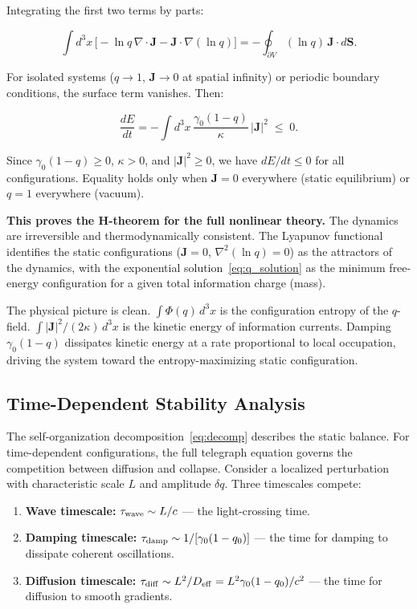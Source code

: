 \documentclass[aps,prd,twocolumn,showpacs,superscriptaddress,preprintnumbers]{revtex4-2}
\begin{document}
Integrating the first two terms by parts:

\begin{equation}
\int d^3x\,\bigl[-\ln q\,\nabla\cdot\mathbf{J} - \mathbf{J}\cdot\nabla(\ln q)\bigr] = -\oint_{\partial V} (\ln q)\,\mathbf{J}\cdot d\mathbf{S}.
\label{eq:boundary_term}
\end{equation}

For isolated systems ($q\to1$, $\mathbf{J}\to0$ at spatial infinity) or periodic boundary conditions, the surface term vanishes.
Then:

\begin{equation}
\boxed{\frac{dE}{dt} = -\int d^3x\,\frac{\gamma_0(1-q)}{\kappa}\,|\mathbf{J}|^2 \;\leq\; 0}.
\label{eq:dEdt_final}
\end{equation}

Since $\gamma_0(1-q)\geq0$, $\kappa>0$, and $|\mathbf{J}|^2\geq0$, we have $dE/dt\leq0$ for all configurations.
Equality holds only when $\mathbf{J}=0$ everywhere (static equilibrium) or $q=1$ everywhere (vacuum).

\textbf{This proves the H-theorem for the full nonlinear theory.}
The dynamics are irreversible and thermodynamically consistent.
The Lyapunov functional identifies the static configurations ($\mathbf{J}=0$, $\nabla^2(\ln q)=0$) as the attractors of the dynamics, with the exponential solution~\eqref{eq:q_solution} as the minimum free-energy configuration for a given total information charge (mass).

The physical picture is clean.
$\int\Phi(q)\,d^3x$ is the configuration entropy of the $q$-field.
$\int|\mathbf{J}|^2/(2\kappa)\,d^3x$ is the kinetic energy of information currents.
Damping $\gamma_0(1-q)$ dissipates kinetic energy at a rate proportional to local occupation, driving the system toward the entropy-maximizing static configuration.

\subsection{Time-Dependent Stability Analysis}
\label{sec:stability}

The self-organization decomposition~\eqref{eq:decomp} describes the static balance.
For time-dependent configurations, the full telegraph equation governs the competition between diffusion and collapse.
Consider a localized perturbation with characteristic scale $L$ and amplitude $\delta q$.
Three timescales compete:

\begin{enumerate}
    \item \textbf{Wave timescale:} $\tau_{\rm wave} \sim L/c$ --- the light-crossing time.
    \item \textbf{Damping timescale:} $\tau_{\rm damp} \sim 1/[\gamma_0(1-q_0)]$ --- the time for damping to dissipate coherent oscillations.
    \item \textbf{Diffusion timescale:} $\tau_{\rm diff} \sim L^2/D_{\rm eff} = L^2\gamma_0(1-q_0)/c^2$ --- the time for diffusion to smooth gradients.
\end{enumerate}
\end{document}
